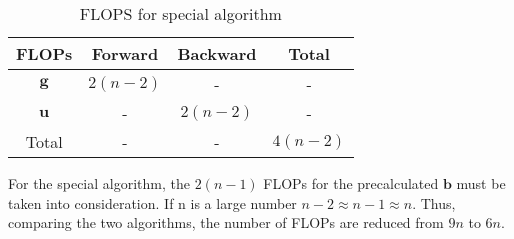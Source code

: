 \documentclass[%
oneside,                 %
final,                   %
10pt]{article}
\begin{document}
\begin{table}[ht]
\caption{FLOPS for special algorithm}
\centering
	\begin{tabular}{c c c c}
		\hline
		FLOPs   & Forward & Backward & Total \\ [0.5ex]
		\hline
		$\mathbf{g}$ & $2 (n-2)$       & -        & -    \\
        	$\mathbf{u}$ & -       & $2 (n-2)$        & -     \\
        	Total        & -       & -        & $4 (n-2)$      \\ [1ex]
		\hline
	\end{tabular}
\end{table}
For the special algorithm, the $2(n-1)$ FLOPs for the precalculated $\mathbf{b}$ must be taken into consideration. If n is a large number $n-2 \approx n-1 \approx n$. Thus, comparing the two algorithms, the number of FLOPs are reduced from $9n$ to $6n$.
\end{document}
